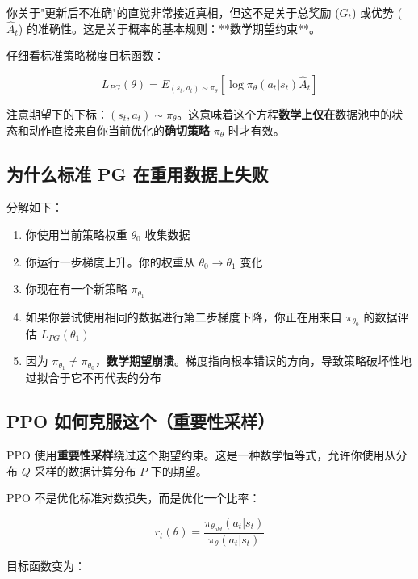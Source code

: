 \documentclass[12pt,a4paper]{article}
\theoremstyle{noteplain}
\theoremstyle{noteexercise}
\begin{document}
你关于"更新后不准确"的直觉非常接近真相，但这不是关于总奖励 ($G_t$) 或优势 ($\hat{A}_t$) 的准确性。这是关于概率的基本规则：**数学期望约束**。

仔细看标准策略梯度目标函数：

\begin{equation}\label{eq:pg-expectation}
  L_{PG}(\theta) = E_{(s_t, a_t) \sim \pi_\theta}\left[\log \pi_\theta(a_t|s_t) \hat{A}_t\right]
\end{equation}

注意期望下的下标：$(s_t, a_t) \sim \pi_\theta$。这意味着这个方程\textbf{数学上仅在}数据池中的状态和动作直接来自你当前优化的\textbf{确切策略} $\pi_\theta$ 时才有效。

\subsection{为什么标准 PG 在重用数据上失败}

分解如下：

\begin{enumerate}
  \setlength{\itemsep}{0.2em}
  \item 你使用当前策略权重 $\theta_0$ 收集数据
  \item 你运行一步梯度上升。你的权重从 $\theta_0 \rightarrow \theta_1$ 变化
  \item 你现在有一个新策略 $\pi_{\theta_1}$
  \item 如果你尝试使用相同的数据进行第二步梯度下降，你正在用来自 $\pi_{\theta_0}$ 的数据评估 $L_{PG}(\theta_1)$
  \item 因为 $\pi_{\theta_1} \neq \pi_{\theta_0}$，\textbf{数学期望崩溃}。梯度指向根本错误的方向，导致策略破坏性地过拟合于它不再代表的分布
\end{enumerate}

\subsection{PPO 如何克服这个（重要性采样）}

PPO 使用\textbf{重要性采样}绕过这个期望约束。这是一种数学恒等式，允许你使用从分布 $Q$ 采样的数据计算分布 $P$ 下的期望。

PPO 不是优化标准对数损失，而是优化一个比率：

\begin{equation}\label{eq:ratio-is}
  r_t(\theta) = \frac{\pi_{\theta_{old}}(a_t|s_t)}{\pi_\theta(a_t|s_t)}
\end{equation}

目标函数变为：
\end{document}
